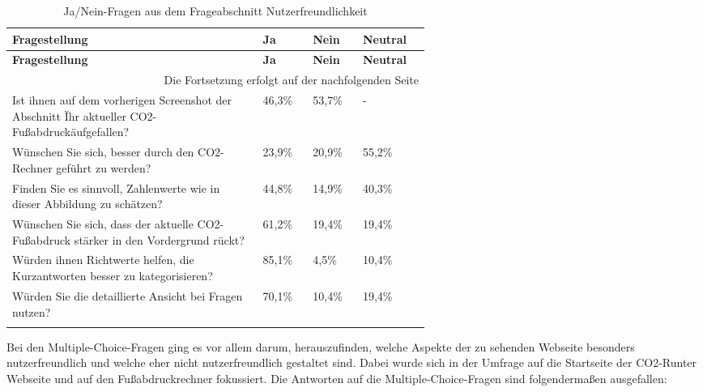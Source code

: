 \begin{longtable}{|p{0.6\linewidth}|l|l|l|}
    \hline
    \textbf{Fragestellung}                                                                              & \textbf{Ja} & \textbf{Nein} & \textbf{Neutral} \\ \hline
    \endfirsthead

    \hline
    \textbf{Fragestellung}                                                                              & \textbf{Ja} & \textbf{Nein} & \textbf{Neutral} \\ \hline
    \endhead

    \hline
    \multicolumn{4}{|r|}{{Die Fortsetzung erfolgt auf der nachfolgenden Seite}}                                                                          \\
    \hline
    \endfoot

    \endlastfoot

    Ist ihnen auf dem vorherigen Screenshot der Abschnitt \"Ihr aktueller CO2-Fußabdruck\" aufgefallen? & 46,3\%      & 53,7\%        & -                \\ \hline
    Wünschen Sie sich, besser durch den            CO2-Rechner geführt zu werden?                       & 23,9\%      & 20,9\%        & 55,2\%           \\ \hline
    Finden Sie es sinnvoll, Zahlenwerte            wie in dieser Abbildung zu schätzen?                 & 44,8\%      & 14,9\%        & 40,3\%           \\ \hline
    Wünschen Sie sich, dass der aktuelle           CO2-Fußabdruck stärker in den Vordergrund rückt?     & 61,2\%      & 19,4\%        & 19,4\%           \\ \hline
    Würden ihnen Richtwerte helfen, die            Kurzantworten besser zu kategorisieren?              & 85,1\%      & 4,5\%         & 10,4\%           \\ \hline
    Würden Sie die detaillierte Ansicht            bei Fragen nutzen?                                   & 70,1\%      & 10,4\%        & 19,4\%           \\ \hline
    \caption{Ja/Nein-Fragen aus dem Frageabschnitt Nutzerfreundlichkeit}
    \label{nutzerfreundlichkeitFragen}
    \\
\end{longtable}

Bei den Multiple-Choice-Fragen ging es vor allem darum, herauszufinden, welche Aspekte der zu sehenden Webseite besonders nutzerfreundlich und welche eher nicht nutzerfreundlich gestaltet sind.
Dabei wurde sich in der Umfrage auf die Startseite der CO2-Runter Webseite und auf den Fußabdruckrechner fokussiert.
Die Antworten auf die Multiple-Choice-Fragen sind folgendermaßen ausgefallen:

